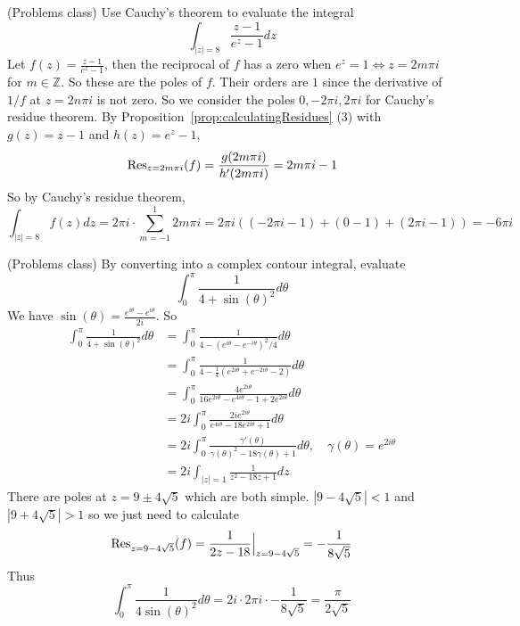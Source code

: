 \begin{example}
	(Problems class) Use Cauchy's theorem to evaluate the integral
	\[
		\int_{|z| = 8} \frac{z - 1}{e^z - 1} dz
	\]
	Let $f(z) = \frac{z - 1}{e^z - 1}$, then the reciprocal of $f$ has a zero when $e^z = 1 \Longleftrightarrow z = 2m \pi i$ for $m \in \mathbb{Z}$. So these are the poles of $f$. Their orders are $1$ since the derivative of $1 / f$ at $z = 2n\pi i$ is not zero. So we consider the poles $0, -2\pi i, 2 \pi i$ for Cauchy's residue theorem. By Proposition~\ref{prop:calculatingResidues} (3) with $g(z) = z - 1$ and $h(z) = e^z - 1$,
	\[
		\text{Res}_{z = 2m\pi i} (f) = \frac{g(2m\pi i)}{h'(2m \pi i)} = 2m \pi i - 1
	\]
	So by Cauchy's residue theorem,
	\[
		\int_{|z| = 8} f(z) dz = 2 \pi i \cdot \sum_{m = -1}^{1} 2m \pi i = 2 \pi i ((-2\pi i - 1) + (0 - 1) + (2\pi i - 1)) = -6 \pi i
	\]
\end{example}

\begin{example}
	(Problems class) By converting into a complex contour integral, evaluate
	\[
		\int_{0}^{\pi} \frac{1}{4 + \sin(\theta)^2} d\theta
	\]
	We have $\sin(\theta) = \frac{e^{i\theta} - e^{i\theta}}{2i}$. So
	\[
		\begin{aligned}
			\int_{0}^{\pi} \frac{1}{4 + \sin(\theta)^2} d\theta & = \int_{0}^{\pi} \frac{1}{4 - {(e^{i\theta} - e^{-i\theta})}^2 / 4} d\theta \\
			& = \int_{0}^{\pi} \frac{1}{4 - \frac{1}{4} (e^{2i\theta} + e^{-2i\theta} - 2)} d\theta \\
			& = \int_{0}^{\pi} \frac{4e^{2i\theta}}{16e^{2i\theta} - e^{4i\theta} - 1 + 2e^{2i\theta}} d\theta \\
			& = 2i \int_{0}^{\pi} \frac{2i e^{2i\theta}}{e^{4i\theta} - 18e^{2i\theta} + 1} d\theta \\
			& = 2i \int_{0}^{\pi} \frac{\gamma'(\theta)}{\gamma(\theta)^2 - 18 \gamma(\theta) + 1} d\theta, \quad \gamma(\theta) = e^{2i\theta} \\
			& = 2i \int_{|z| = 1} \frac{1}{z^2 - 18z + 1} dz
		\end{aligned}
	\]
	There are poles at $z = 9 \pm 4\sqrt{5}$ which are both simple. $|9 - 4\sqrt{5}| < 1$ and $|9 + 4\sqrt{5}| > 1$ so we just need to calculate
	\[
		\text{Res}_{z = 9 - 4\sqrt{5}} (f) = \frac{1}{2z - 18}\Big|_{z = 9 - 4\sqrt{5}} = -\frac{1}{8\sqrt{5}}
	\]
	Thus
	\[
		\int_{0}^{\pi} \frac{1}{4 \sin(\theta)^2} d\theta = 2i \cdot 2 \pi i \cdot -\frac{1}{8\sqrt{5}} = \frac{\pi}{2\sqrt{5}}
	\]
\end{example}

